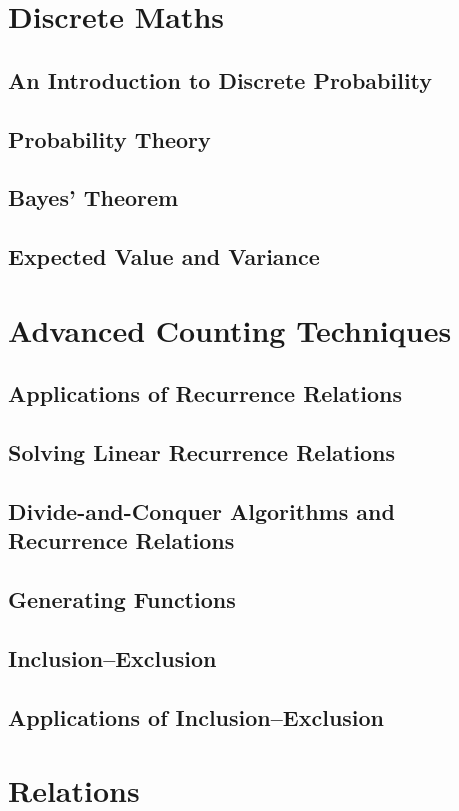 \documentclass{article}
\begin{document}
\section{Discrete Maths}

\subsection{An Introduction to Discrete Probability}
\subsection{Probability Theory}
\subsection{Bayes’ Theorem}
\subsection{Expected Value and Variance}

\section{Advanced Counting Techniques}

\subsection{Applications of Recurrence Relations}
\subsection{Solving Linear Recurrence Relations}
\subsection{Divide-and-Conquer Algorithms and Recurrence Relations}
\subsection{Generating Functions}
\subsection{Inclusion–Exclusion}
\subsection{Applications of Inclusion–Exclusion}

\section{Relations}
\end{document}
